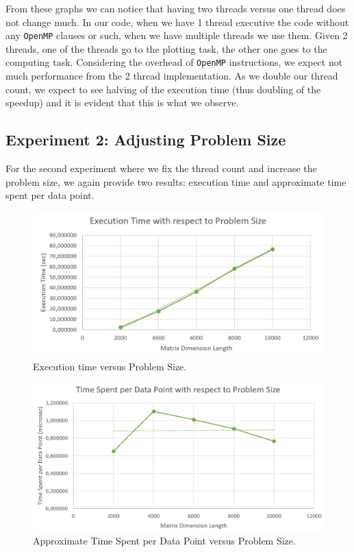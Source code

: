 \documentclass[11pt,reqno]{amsart}
\newcommand{\code}[1]{\texttt{#1}}
\begin{document}
From these graphs we can notice that having two threads versus one thread does not change much. In our code, when we have 1 thread executive the code without any \code{OpenMP} clauses or such, when we have multiple threads we use them. Given 2 threads, one of the threads go to the plotting task, the other one goes to the computing task. Considering the overhead of \code{OpenMP} instructions, we expect not much performance from the 2 thread implementation.  As we double our thread count, we expect to see halving of the execution time (thus doubling of the speedup) and it is evident that this is what we observe.

\subsection{Experiment 2: Adjusting Problem Size}
For the second experiment where we fix the thread count and increase the problem size, we again provide two results: execution time and approximate time spent per data point.

\begin{figure}[h]
\centering
\label{fig:exp2_1}
\includegraphics[width=0.8\linewidth]{exp2_1.png}
\caption{Execution time versus Problem Size.}
\end{figure}

\begin{figure}[h]
\centering
\label{fig:exp2_2}
\includegraphics[width=0.8\linewidth]{exp2_2.png}
\caption{Approximate Time Spent per Data Point versus Problem Size.}
\end{figure}
\end{document}
